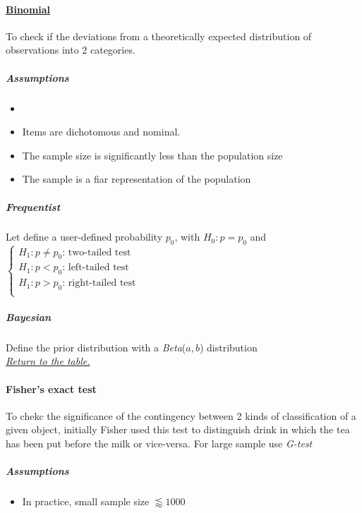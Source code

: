 \paragraph{\hyperref[binomial_test]{Binomial}}
To check if the deviations from a theoretically expected distribution of observations into
2 categories.\\

\subparagraph{Assumptions}
\begin{itemize}
    \item {}
    \item Items are dichotomous and nominal.
    \item The sample size is significantly less than the population size
    \item The sample is a fiar representation of the population
\end{itemize}


\subparagraph{Frequentist}
Let define a user-defined probability $p_{0}$, with $H_{0}: p = p_{0}$ and
$\begin{cases}
    H_{1}: p \neq p_{0}\text{: two-tailed test} \\
    H_{1}: p < p_{0}\text{: left-tailed test} \\
    H_{1}: p > p_{0}\text{: right-tailed test} \\
     
\end{cases}$

\subparagraph{Bayesian}
Define the prior distribution with a \emph{Beta}($a,b$) distribution\\

\textit{\hyperref[statistical_method_table]{Return to the table.}}


\paragraph{Fisher's exact test}
To chekc the significance of the contingency between 2 kinds of classification of a given
object, initially Fisher used this test to distinguish drink in which the tea has been put
before the milk or vice-versa.
For large sample use \emph{G-test}

\subparagraph{Assumptions}
\begin{itemize}
    \item In practice, small sample size $\lessapprox 1000$
\end{itemize}


